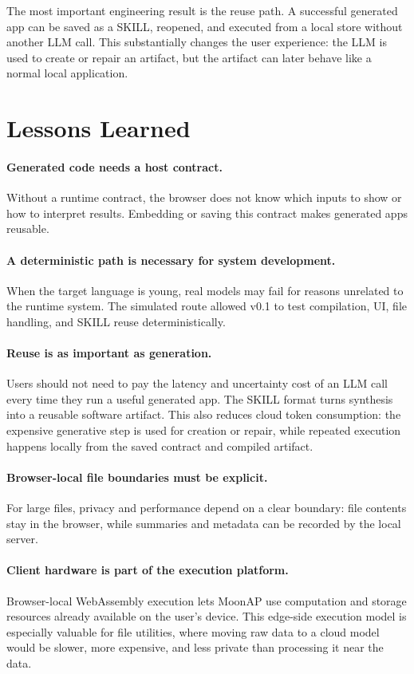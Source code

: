 \documentclass[11pt]{article}
\newcommand{\moonap}{MoonAP}
\newcommand{\skill}{SKILL}
\newcommand{\wasm}{WebAssembly}
\begin{document}
The most important engineering result is the reuse path. A successful generated app can be saved as a \skill{}, reopened, and executed from a local store without another LLM call. This substantially changes the user experience: the LLM is used to create or repair an artifact, but the artifact can later behave like a normal local application.

\section{Lessons Learned}

\paragraph{Generated code needs a host contract.}
Without a runtime contract, the browser does not know which inputs to show or how to interpret results. Embedding or saving this contract makes generated apps reusable.

\paragraph{A deterministic path is necessary for system development.}
When the target language is young, real models may fail for reasons unrelated to the runtime system. The simulated route allowed v0.1 to test compilation, UI, file handling, and \skill{} reuse deterministically.

\paragraph{Reuse is as important as generation.}
Users should not need to pay the latency and uncertainty cost of an LLM call every time they run a useful generated app. The \skill{} format turns synthesis into a reusable software artifact. This also reduces cloud token consumption: the expensive generative step is used for creation or repair, while repeated execution happens locally from the saved contract and compiled artifact.

\paragraph{Browser-local file boundaries must be explicit.}
For large files, privacy and performance depend on a clear boundary: file contents stay in the browser, while summaries and metadata can be recorded by the local server.

\paragraph{Client hardware is part of the execution platform.}
Browser-local \wasm{} execution lets \moonap{} use computation and storage resources already available on the user's device. This edge-side execution model is especially valuable for file utilities, where moving raw data to a cloud model would be slower, more expensive, and less private than processing it near the data.
\end{document}
